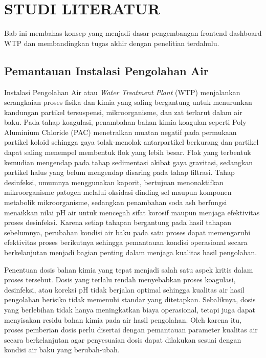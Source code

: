 \cleardoublepage
\chapter{STUDI LITERATUR}
\label{chap:studi-literatur}

Bab ini membahas konsep yang menjadi dasar pengembangan frontend dashboard WTP
dan membandingkan tugas akhir dengan penelitian terdahulu. 

\section{Pemantauan Instalasi Pengolahan Air}

Instalasi Pengolahan Air atau \textit{Water Treatment Plant} (WTP) menjalankan
serangkaian proses fisika dan kimia yang saling bergantung untuk menurunkan
kandungan partikel tersuspensi, mikroorganisme, dan zat terlarut dalam air
baku. Pada tahap koagulasi, penambahan bahan kimia koagulan seperti Poly
Aluminium Chloride (PAC) menetralkan muatan negatif pada permukaan partikel
koloid sehingga gaya tolak-menolak antarpartikel berkurang dan partikel dapat
saling menempel membentuk flok yang lebih besar. Flok yang terbentuk kemudian
mengendap pada tahap sedimentasi akibat gaya gravitasi, sedangkan partikel
halus yang belum mengendap disaring pada tahap filtrasi. Tahap desinfeksi,
umumnya menggunakan kaporit, bertujuan menonaktifkan mikroorganisme patogen
melalui oksidasi dinding sel maupun komponen metabolik mikroorganisme,
sedangkan penambahan soda ash berfungsi menaikkan nilai pH air untuk mencegah
sifat korosif maupun menjaga efektivitas proses desinfeksi. Karena setiap
tahapan bergantung pada hasil tahapan sebelumnya, perubahan kondisi air baku
pada satu proses dapat memengaruhi efektivitas proses berikutnya sehingga
pemantauan kondisi operasional secara berkelanjutan menjadi bagian penting
dalam menjaga kualitas hasil pengolahan.

Penentuan dosis bahan kimia yang tepat menjadi salah satu aspek kritis dalam
proses tersebut. Dosis yang terlalu rendah menyebabkan proses koagulasi,
desinfeksi, atau koreksi pH tidak berjalan optimal sehingga kualitas air hasil
pengolahan berisiko tidak memenuhi standar yang ditetapkan. Sebaliknya, dosis
yang berlebihan tidak hanya meningkatkan biaya operasional, tetapi juga dapat
menyisakan residu bahan kimia pada air hasil pengolahan. Oleh karena itu,
proses pemberian dosis perlu disertai dengan pemantauan parameter kualitas air
secara berkelanjutan agar penyesuaian dosis dapat dilakukan sesuai dengan
kondisi air baku yang berubah-ubah.

